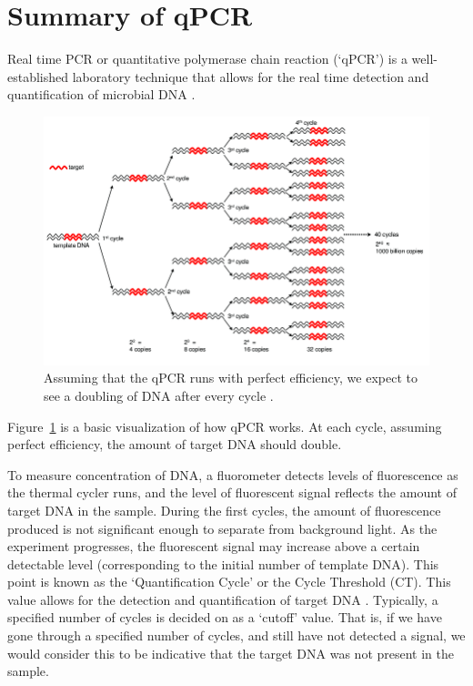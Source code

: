 \label{chapter:problem}


\newlength{\savedunitlength}
\setlength{\unitlength}{2em}


\section{Summary of qPCR}

Real time PCR or quantitative polymerase chain reaction (`qPCR') is a well-established laboratory technique that allows for the real time detection and quantification of microbial DNA \citep{introqpcr}.



\begin{figure}[H]
\includegraphics[scale=0.5]{Chapter2Images/amp.png}
\caption{Assuming that the qPCR runs with perfect efficiency, we expect to see a doubling of DNA after every cycle \citep{foodscience}.}
\label{fig:amp}
\end{figure} 

\newpage



Figure~\ref{fig:amp} is a basic visualization of how qPCR works. At each cycle, assuming perfect efficiency, the amount of target DNA should double.

\vspace{5mm}

To measure concentration of DNA, a fluorometer detects levels of fluorescence as the thermal cycler runs, and the level of fluorescent signal reflects the amount of target DNA in the sample. During the first cycles, the amount of fluorescence produced is not significant enough to separate from background light. As the experiment progresses, the fluorescent signal may increase above a certain detectable level (corresponding to the initial number of template DNA). This point is known as the `Quantification Cycle' or the Cycle Threshold (CT). This value allows for the detection and quantification of target DNA \citep{ctmethod}. Typically, a specified number of cycles is decided on as a `cutoff' value. That is, if we have gone through a specified number of cycles, and still have not detected a signal, we would consider this to be indicative that the target DNA was not present in the sample.



